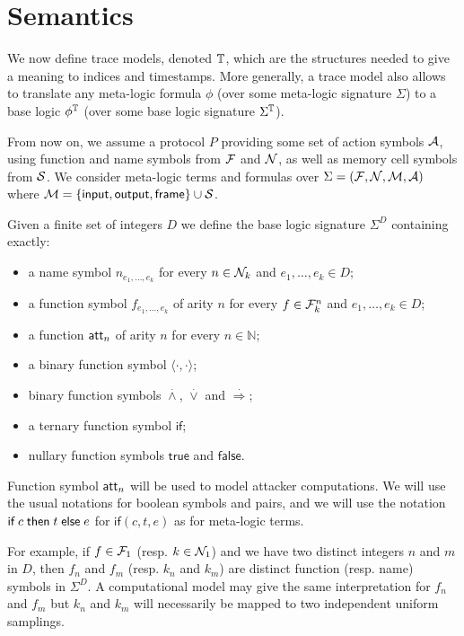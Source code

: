 \section{Semantics}

We now define trace models, denoted $\mathbb{T}$, which are the structures needed to
give a meaning to indices and timestamps. More generally, a trace model
also allows to translate any meta-logic formula $\phi$
(over some meta-logic signature $\Sigma$)
to a base logic $\phi^{\mathbb{T}}$ (over some base logic signature $\Sigma^{\mathbb{T}}$).

\medskip

From now on, we assume a protocol $P$ providing some set of action
symbols $\mathcal{A}$, using function and name symbols from $\mathcal{F}$ and $\mathcal{N}$,
as well as memory cell symbols from $\mathcal{S}$.
We consider meta-logic terms and formulas over $\Sigma = (\mathcal{F},\mathcal{N},\mathcal{M},\mathcal{A})$
where $\mathcal{M} = \{ \textsf{input}, \textsf{output}, \textsf{frame} \} \cup \mathcal{S}$.

\begin{definition}
  Given a finite set of integers $D$ we define the base logic
  signature $\Sigma^D$ containing exactly:
  \begin{itemize}
    \item a name symbol $n_{e_1,\ldots,e_k}$ for every $n \in \mathcal{N}_k$
       and $e_1,\ldots,e_k \in D$;
    \item a function symbol $f_{e_1,\ldots,e_k}$ of arity $n$ for every
      $f \in \mathcal{F}_k^n$ and $e_1,\ldots,e_k \in D$;
    \item a function $\mathsf{att}_n$ of arity $n$ for every $n\in\mathbb{N}$;
    \item a binary function symbol $\langle \cdot , \cdot \rangle$;
    \item binary function symbols
      $\stackrel{.}{\wedge}$, $\stackrel{.}{\vee}$ and
      $\stackrel{.}{\Rightarrow}$;
    \item a ternary function symbol $\mathsf{if}$;
    \item nullary function symbols $\mathsf{true}$ and $\mathsf{false}$.
  \end{itemize}
  Function symbol $\mathsf{att}_n$ will be used to model attacker computations.
  We will use the usual notations for boolean symbols and pairs,
  and we will use the notation $\textsf{if}\; c \;\textsf{then}\; t \;\textsf{else}\; e$
  for $\mathsf{if}(c,t,e)$ as for meta-logic terms.
\end{definition}

For example, if $f \in \mathcal{F}_1$ (resp. $k \in \mathcal{N}_1$) and we have two distinct
integers $n$ and $m$ in $D$, then $f_n$ and $f_m$ (resp. $k_n$ and $k_m$)
are distinct function (resp. name) symbols in $\Sigma^D$.
A computational model may give the same interpretation for $f_n$ and $f_m$
but $k_n$ and $k_m$ will necessarily be mapped to two independent uniform
samplings.

